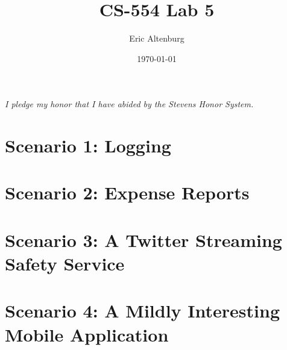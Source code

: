 \documentclass[11pt]{article}
\title{CS-554 Lab 5}
\author{Eric Altenburg}
\date{\today}
\begin{document}
	\maketitle


	\begin{center}
		\textit{I pledge my honor that I have abided by the Stevens Honor System.}
	\end{center}


	\section*{Scenario 1: Logging}
	\lipsum[2-3]

	\section*{Scenario 2: Expense Reports}
	\lipsum[2-4]

	\section*{Scenario 3: A Twitter Streaming Safety Service}
	\lipsum[2-3]

	\section*{Scenario 4: A Mildly Interesting Mobile Application}
	\lipsum[3-6]
\end{document}
